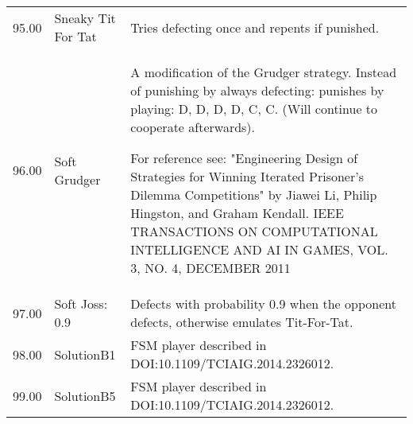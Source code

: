 \begin{table}[!hbtp]
\begin{adjustbox}{width=2\textwidth, angle=90}
\begin{tabular}{rll}
	95.00  & Sneaky Tit For Tat          & Tries defecting once and repents if punished.                                                                                     \\
	96.00  & Soft Grudger                & A modification of the Grudger strategy. Instead of punishing by always
	defecting: punishes by playing: D, D, D, D, C, C. (Will continue to
	cooperate afterwards).

	For reference see: "Engineering Design of Strategies for Winning
	Iterated Prisoner's Dilemma Competitions" by Jiawei Li, Philip Hingston,
	and Graham Kendall.  IEEE TRANSACTIONS ON COMPUTATIONAL INTELLIGENCE AND AI
	IN GAMES, VOL. 3, NO. 4, DECEMBER 2011                                                                                                                                                                                                                                                                                                                                                                                                                                                                                                                                                                  \\
	97.00  & Soft Joss: 0.9              & Defects with probability 0.9 when the opponent defects, otherwise
	emulates Tit-For-Tat.                                                                                                                                                                                                                                                                                                                                                                                                                                                                                                                                                                                                                                                                                                                                                                                                                                                                                                                              \\
	98.00  & SolutionB1                  & FSM player described in DOI:10.1109/TCIAIG.2014.2326012.                                                                          \\
	99.00  & SolutionB5                  & FSM player described in DOI:10.1109/TCIAIG.2014.2326012.                                                                          \\

\end{tabular}
\end{adjustbox}
\end{table}
